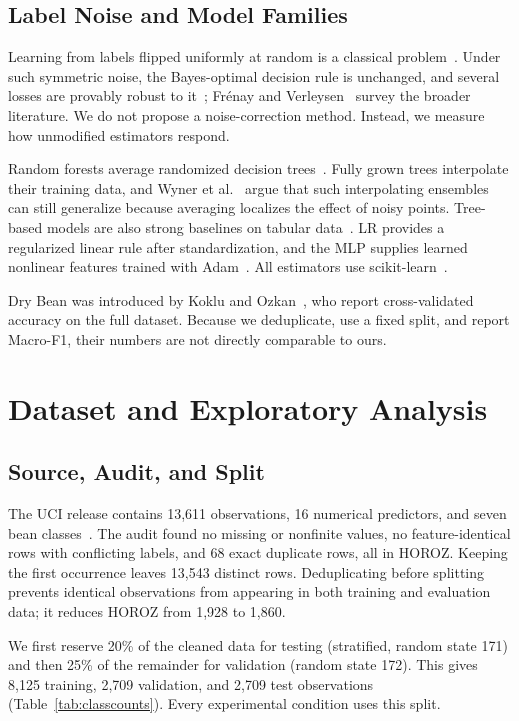 \documentclass[conference,letterpaper]{IEEEtran}
\begin{document}
\subsection{Label Noise and Model Families}
Learning from labels flipped uniformly at random is a classical problem~\cite{angluin1988noisy}. Under such symmetric noise, the Bayes-optimal decision rule is unchanged, and several losses are provably robust to it~\cite{natarajan2013noisy,ghosh2017robust}; Fr\'enay and Verleysen~\cite{frenay2014survey} survey the broader literature. We do not propose a noise-correction method. Instead, we measure how unmodified estimators respond.

Random forests average randomized decision trees~\cite{breiman2001randomforests}. Fully grown trees interpolate their training data, and Wyner et al.~\cite{wyner2017interpolating} argue that such interpolating ensembles can still generalize because averaging localizes the effect of noisy points. Tree-based models are also strong baselines on tabular data~\cite{grinsztajn2022tree}. LR provides a regularized linear rule after standardization, and the MLP supplies learned nonlinear features trained with Adam~\cite{kingma2015adam}. All estimators use scikit-learn~\cite{pedregosa2011scikit}.

Dry Bean was introduced by Koklu and Ozkan~\cite{koklu2020drybeans}, who report cross-validated accuracy on the full dataset. Because we deduplicate, use a fixed split, and report Macro-F1, their numbers are not directly comparable to ours.

\section{Dataset and Exploratory Analysis}
\label{sec:data}
\subsection{Source, Audit, and Split}
The UCI release contains 13,611 observations, 16 numerical predictors, and seven bean classes~\cite{uci2020drybean}. The audit found no missing or nonfinite values, no feature-identical rows with conflicting labels, and 68 exact duplicate rows, all in HOROZ. Keeping the first occurrence leaves 13,543 distinct rows. Deduplicating before splitting prevents identical observations from appearing in both training and evaluation data; it reduces HOROZ from 1,928 to 1,860.

We first reserve 20\% of the cleaned data for testing (stratified, random state 171) and then 25\% of the remainder for validation (random state 172). This gives 8,125 training, 2,709 validation, and 2,709 test observations (Table~\ref{tab:classcounts}). Every experimental condition uses this split.
\end{document}
